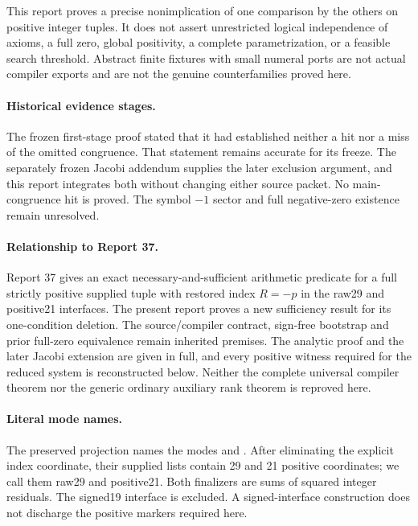 \documentclass[11pt,letterpaper]{article}
\theoremstyle{definition}\newtheorem{definition}[theorem]{Definition}
\theoremstyle{remark}\newtheorem{remark}[theorem]{Remark}
\newcommand{\code}[1]{\texttt{\detokenize{#1}}}
\begin{document}
This report proves a precise nonimplication of one comparison by the others on positive integer tuples. It does not assert unrestricted logical independence of axioms, a full zero, global positivity, a complete parametrization, or a feasible search threshold. Abstract finite fixtures with small numeral ports are not actual compiler exports and are not the genuine counterfamilies proved here.

\paragraph{Historical evidence stages.}
The frozen first-stage proof stated that it had established neither a hit nor a miss of the omitted congruence. That statement remains accurate for its freeze. The separately frozen Jacobi addendum supplies the later exclusion argument, and this report integrates both without changing either source packet. No main-congruence hit is proved. The symbol $-1$ sector and full negative-zero existence remain unresolved.

\paragraph{Relationship to Report 37.}
Report 37 gives an exact necessary-and-sufficient arithmetic predicate for a full strictly positive supplied tuple with restored index $R=-p$ in the raw29 and positive21 interfaces. The present report proves a new sufficiency result for its one-condition deletion. The source/compiler contract, sign-free bootstrap and prior full-zero equivalence remain inherited premises. The analytic proof and the later Jacobi extension are given in full, and every positive witness required for the reduced system is reconstructed below. Neither the complete universal compiler theorem nor the generic ordinary auxiliary rank theorem is reproved here.

\paragraph{Literal mode names.}
The preserved projection names the modes \code{raw30} and \code{positive22}. After eliminating the explicit index coordinate, their supplied lists contain 29 and 21 positive coordinates; we call them raw29 and positive21. Both finalizers are sums of squared integer residuals. The signed19 interface is excluded. A signed-interface construction does not discharge the positive markers required here.
\end{document}
